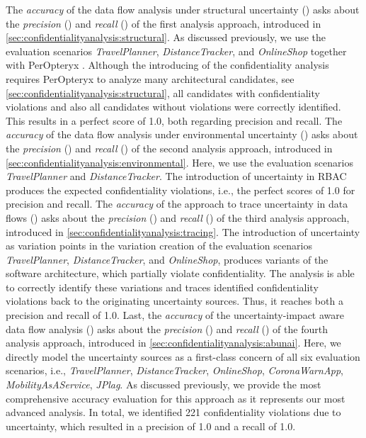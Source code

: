 The \emph{accuracy} of the data flow analysis under structural uncertainty () asks about the \emph{precision} () and \emph{recall} () of the first analysis approach, introduced in \autoref{sec:confidentialityanalysis:structural}.
As discussed previously, we use the evaluation scenarios \emph{TravelPlanner}, \emph{DistanceTracker}, and \emph{OnlineShop} together with PerOpteryx \cite{koziolek_peropteryx_2011,koziolek_automated_2011}.
Although the introducing of the confidentiality analysis requires PerOpteryx to analyze many architectural candidates, see \autoref{sec:confidentialityanalysis:structural}, all candidates with confidentiality violations and also all candidates without violations were correctly identified.
This results in a perfect score of 1.0, both regarding precision and recall.
The \emph{accuracy} of the data flow analysis under environmental uncertainty () asks about the \emph{precision} () and \emph{recall} () of the second analysis approach, introduced in \autoref{sec:confidentialityanalysis:environmental}.
Here, we use the evaluation scenarios \emph{TravelPlanner} and \emph{DistanceTracker}.
The introduction of uncertainty in \ac{RBAC} produces the expected confidentiality violations, i.e., the perfect scores of 1.0 for precision and recall.
The \emph{accuracy} of the approach to trace uncertainty in data flows () asks about the \emph{precision} () and \emph{recall} () of the third analysis approach, introduced in \autoref{sec:confidentialityanalysis:tracing}.
The introduction of uncertainty as variation points in the variation creation \cite{mehl_palladio_2022} of the evaluation scenarios \emph{TravelPlanner}, \emph{DistanceTracker}, and \emph{OnlineShop}, produces variants of the software architecture, which partially violate confidentiality.
The analysis is able to correctly identify these variations and traces identified confidentiality violations back to the originating uncertainty sources.
Thus, it reaches both a precision and recall of 1.0.
Last, the \emph{accuracy} of the uncertainty-impact aware data flow analysis () asks about the \emph{precision} () and \emph{recall} () of the fourth analysis approach, introduced in \autoref{sec:confidentialityanalysis:abunai}.
Here, we directly model the uncertainty sources as a first-class concern of all six evaluation scenarios, i.e., \emph{TravelPlanner}, \emph{DistanceTracker}, \emph{OnlineShop}, \emph{CoronaWarnApp}, \emph{MobilityAsAService}, \emph{JPlag}.
As discussed previously, we provide the most comprehensive accuracy evaluation for this approach as it represents our most advanced analysis.
In total, we identified 221 confidentiality violations due to uncertainty, which resulted in a precision of 1.0 and a recall of 1.0.

